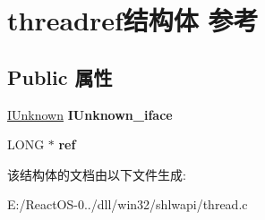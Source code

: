 \hypertarget{structthreadref}{}\section{threadref结构体 参考}
\label{structthreadref}
\subsection*{Public 属性}
\begin{DoxyCompactItemize}
\item 
\mbox{\label{structthreadref_a915c0c2a7281d31d95cd8aade38b01bb}} 
\hyperlink{interface_i_unknown}{I\+Unknown} {\bfseries I\+Unknown\+\_\+iface}
\item 
\mbox{\label{structthreadref_a76aa3d2eac0b4fb4ee3ef4b24289ad82}} 
L\+O\+NG $\ast$ {\bfseries ref}
\end{DoxyCompactItemize}


该结构体的文档由以下文件生成\+:\begin{DoxyCompactItemize}
\item 
E\+:/\+React\+O\+S-\/0../dll/win32/shlwapi/thread.\+c\end{DoxyCompactItemize}
